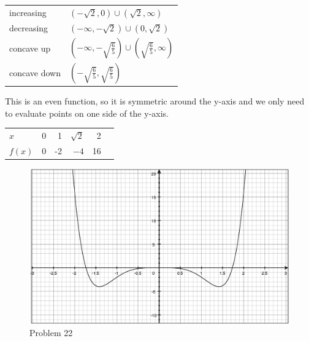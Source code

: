 \documentclass[fleqn]{exam}
\begin{document}
\begin{description}
\begin{tabular}{ll}
\toprule
increasing & $(-\sqrt{2}, 0) \cup (\sqrt{2}, \infty)$  \\
decreasing & $(-\infty, -\sqrt{2}) \cup (0, \sqrt{2})$ \\
\midrule
concave up   & $\left(- \infty, -\sqrt{\frac{6}{5}} \right) \cup \left( \sqrt{\frac{6}{5}}, \infty \right)$ \\
concave down & $\left(-\sqrt{\frac{6}{5}}, \sqrt{\frac{6}{5}} \right)$ \\
\bottomrule
\end{tabular}

This is an even function, so it is symmetric around the y-axis and we only need to evaluate points on one side of the
y-axis.

\begin{tabular}{lrrrrr}
\toprule
$x$    & 0 & 1  & $\sqrt{2}$ &  2 & \\
$f(x)$ & 0 & -2 &       $-4$ & 16 & \\
\bottomrule
\end{tabular}

\begin{figure}[H]
  \centering
  \includegraphics[scale=.3]{problem_22.eps}
  \caption*{Problem 22}
\end{figure}


\end{description}
\end{document}
